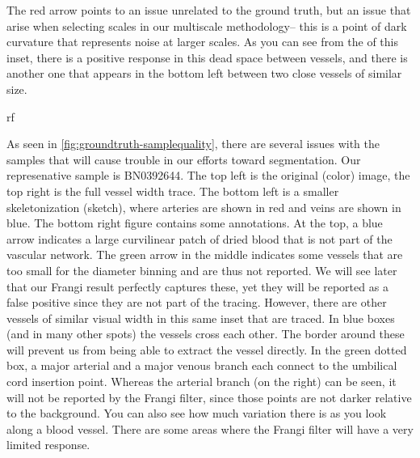 The red arrow points to an issue unrelated to the ground truth, but an issue that arise when selecting scales in our multiscale methodology-- this is a point of dark curvature that represents noise at larger scales. As you can see from the \Vmax of this inset, there is a positive response in this dead space between vessels, and there is another one that appears in the bottom left between two close vessels of similar size. 

rf

As seen in \cref{fig:groundtruth-samplequality}, there are several issues with the samples that will cause trouble in our efforts toward segmentation. Our represenative sample is BN0392644. The top left is the original (color) image, the top right is the full vessel width trace. The bottom left is a smaller skeletonization (sketch), where arteries are shown in red and veins are shown in blue. The bottom right figure contains some annotations. At the top, a blue arrow indicates a large curvilinear patch of dried blood that is not part of the vascular network. The green arrow in the middle indicates some vessels that are too small for the diameter binning and are thus not reported. We will see later that our Frangi result perfectly captures these, yet they will be reported as a false positive since they are not part of the tracing. However, there are other vessels of similar visual width in this same inset that are traced. In blue boxes (and in many other spots) the vessels cross each other. The border around these will prevent us from being able to extract the vessel directly. In the green dotted box, a major arterial and a major venous branch each connect to the umbilical cord insertion point. Whereas the arterial branch (on the right) can be seen, it will not be reported by the Frangi filter, since those points are not darker relative to the background. You can also see how much variation there is as you look along a blood vessel. There are some areas where the Frangi filter will have a very limited response. 



